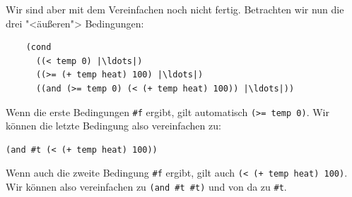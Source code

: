 Wir sind aber mit dem Vereinfachen noch nicht fertig. Betrachten wir
nun die drei "<äußeren"> Bedingungen:
%
\begin{lstlisting}
    (cond
      ((< temp 0) |\ldots|)
      ((>= (+ temp heat) 100) |\ldots|)
      ((and (>= temp 0) (< (+ temp heat) 100)) |\ldots|))
\end{lstlisting}
%
Wenn die erste Bedingungen \lstinline{#f} ergibt, gilt automatisch
\lstinline{(>= temp 0)}.  Wir können die letzte Bedingung also
vereinfachen zu:
%
\begin{lstlisting}
(and #t (< (+ temp heat) 100))
\end{lstlisting}
%
Wenn auch die zweite Bedingung \lstinline{#f} ergibt, gilt auch
\lstinline{(< (+ temp heat) 100)}.
Wir können also vereinfachen zu \lstinline{(and #t #t)}
und von da zu \lstinline{#t}.

